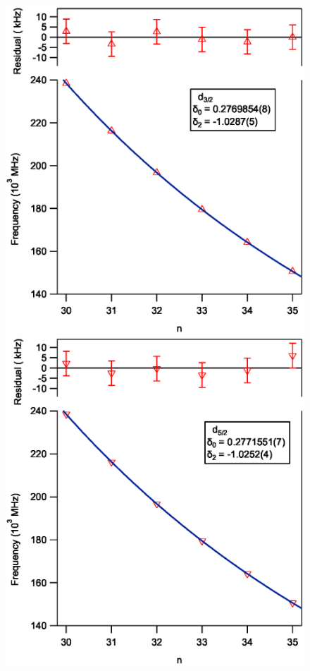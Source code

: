 \documentclass[landscape]{sciposter}
\begin{document}
\begin{multicols}{4}
\begin{figure}
	\begin{center}
		\includegraphics[scale = 0.90]{d32_qd_new.eps}
		\includegraphics[scale = 0.90]{d52_qd_new.eps}

\end{center}
\end{figure}
\end{multicols}
\end{document}
